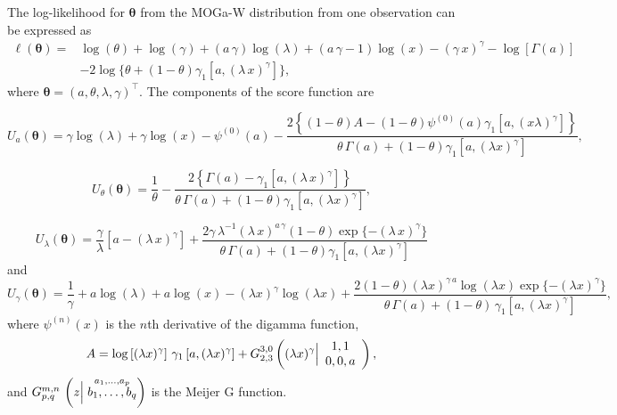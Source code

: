 \documentclass[twoside,leqno,11pt]{article}
\begin{document}
The log-likelihood for $\boldsymbol{\theta}$ from the MOGa-W distribution from one observa\-tion can be expressed as 
\begin{align}
\ell (\boldsymbol{\theta})=& \log (\theta)+\log (\gamma)+(a\,\gamma)\log (\lambda)+(a\,\gamma-1)\log(x)-(\gamma\, x)^\gamma-\log[\Gamma(a)]\nonumber \\ &-2\log\{\theta+(1-\theta)\gamma_1[a,(\lambda\,x)^\gamma]\},
\end{align}
where $\boldsymbol{\theta}=(a,\theta,\lambda,\gamma)^\top$. The components of the score function are

\begin{equation*}
U_{a}(\boldsymbol{\theta})=\gamma  \log (\lambda )+\gamma  \log (x)-\psi ^{(0)}(a)-\frac{2\left\{(1-\theta ) A-(1-\theta ) \psi ^{(0)}(a) \gamma_1 \left[a,(x \lambda
   )^{\gamma }\right]\right\}}{\theta\,\Gamma(a)+(1-\theta)\gamma_1\left[a,(\lambda x)^{\gamma }\right]},
\end{equation*}

\begin{equation*}
U_{\theta}(\boldsymbol{\theta})=\frac{1}{\theta}-\frac{2\left\{\Gamma(a)-\gamma_1\left[a,(\lambda\,x)^\gamma\right]\right\}}{\theta\,\Gamma(a)+(1-\theta)\gamma_1\left[a,(\lambda x)^\gamma\right]},
\end{equation*}

\begin{equation*}
U_{\lambda}(\boldsymbol{\theta})=\frac{\gamma }{\lambda }\left[a-(\lambda\,x)^\gamma\right]+\frac{2 \gamma \,\lambda^{-1}(\lambda\,x)^{a\,\gamma} (1-\theta )\exp\{-(\lambda\,x)^\gamma\} }{\theta \,\Gamma(a)+(1-\theta )
   \gamma_1 \left[a,(\lambda x)^{\gamma }\right]}
\end{equation*}
and
\begin{equation*}		
U_{\gamma}(\boldsymbol{\theta})=\frac{1}{\gamma }+a \log (\lambda )+a \log (x)-(\lambda  x)^{\gamma } \log
   (\lambda  x)+\frac{2 (1-\theta )(\lambda
   x)^{\gamma\,a } \log (\lambda  x)\exp\{-(\lambda x)^{\gamma }\}  }{\theta \,\Gamma(a)+(1-\theta)\,
   \gamma_1\left[a,(\lambda x)^{\gamma }\right]},
\end{equation*}
where $\psi^{(n)}(x)$ is the $n$th derivative of the digamma function,
\begin{align*}
A=\log\left[(\lambda  x)^{\gamma }\right] \,\gamma_1 \left[a,(\lambda x)^{\gamma}\right]
+G_{2,3}^{3,0}\left((\lambda x)^{\gamma }\Big{|}
\begin{array}{c}
 1,1 \\
 0,0,a \\
\end{array}
\right),
\end{align*}
and $G^{m,n}_{p,q}\,\left(z \Big{|}	\stackrel{a_{1},\ldots,a_{p}}{b_{1},\ldots,b_{q}}\right)$ is the Meijer G function.
\end{document}
